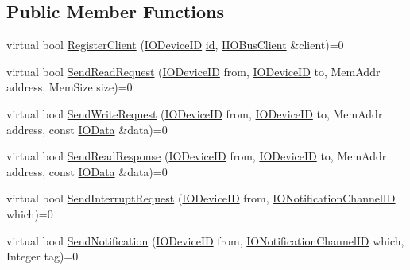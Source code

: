 \subsection*{Public Member Functions}
\begin{DoxyCompactItemize}
\item 
virtual bool \hyperlink{class_simulator_1_1_i_i_o_bus_ad6100dce5f4663af45cf7613643d7d57}{Register\+Client} (\hyperlink{namespace_simulator_a3493d987c866ad6b8aaa704c42502db0}{I\+O\+Device\+I\+D} \hyperlink{mtconf_8c_aa3185401f04d30bd505daebf48c39cc5}{id}, \hyperlink{class_simulator_1_1_i_i_o_bus_client}{I\+I\+O\+Bus\+Client} \&client)=0
\item 
virtual bool \hyperlink{class_simulator_1_1_i_i_o_bus_a7cfc3fdf03f155a71e7568ca656136c8}{Send\+Read\+Request} (\hyperlink{namespace_simulator_a3493d987c866ad6b8aaa704c42502db0}{I\+O\+Device\+I\+D} from, \hyperlink{namespace_simulator_a3493d987c866ad6b8aaa704c42502db0}{I\+O\+Device\+I\+D} to, Mem\+Addr address, Mem\+Size size)=0
\item 
virtual bool \hyperlink{class_simulator_1_1_i_i_o_bus_a75919974ba441b51cb733eb6a276c0f3}{Send\+Write\+Request} (\hyperlink{namespace_simulator_a3493d987c866ad6b8aaa704c42502db0}{I\+O\+Device\+I\+D} from, \hyperlink{namespace_simulator_a3493d987c866ad6b8aaa704c42502db0}{I\+O\+Device\+I\+D} to, Mem\+Addr address, const \hyperlink{struct_simulator_1_1_i_o_data}{I\+O\+Data} \&data)=0
\item 
virtual bool \hyperlink{class_simulator_1_1_i_i_o_bus_ad55542e3e8facd94bacbccd0defd2255}{Send\+Read\+Response} (\hyperlink{namespace_simulator_a3493d987c866ad6b8aaa704c42502db0}{I\+O\+Device\+I\+D} from, \hyperlink{namespace_simulator_a3493d987c866ad6b8aaa704c42502db0}{I\+O\+Device\+I\+D} to, Mem\+Addr address, const \hyperlink{struct_simulator_1_1_i_o_data}{I\+O\+Data} \&data)=0
\item 
virtual bool \hyperlink{class_simulator_1_1_i_i_o_bus_aa4449031b931a2c4146490f1a047f5be}{Send\+Interrupt\+Request} (\hyperlink{namespace_simulator_a3493d987c866ad6b8aaa704c42502db0}{I\+O\+Device\+I\+D} from, \hyperlink{namespace_simulator_a951e1bf3ee91c11c980382a7bcbba287}{I\+O\+Notification\+Channel\+I\+D} which)=0
\item 
virtual bool \hyperlink{class_simulator_1_1_i_i_o_bus_afe7511b05f67abee5678f500f630f313}{Send\+Notification} (\hyperlink{namespace_simulator_a3493d987c866ad6b8aaa704c42502db0}{I\+O\+Device\+I\+D} from, \hyperlink{namespace_simulator_a951e1bf3ee91c11c980382a7bcbba287}{I\+O\+Notification\+Channel\+I\+D} which, Integer tag)=0

\end{DoxyCompactItemize}
